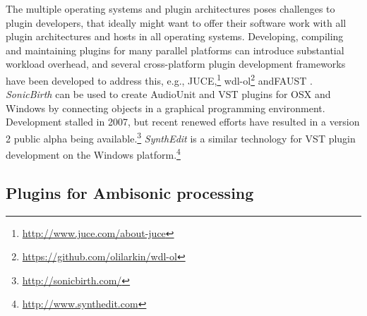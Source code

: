 \documentclass{article}
\begin{document}
The multiple operating systems and plugin architectures poses challenges to plugin developers, that ideally might want to offer their software work with all plugin architectures and hosts in all operating systems.
Developing, compiling and maintaining plugins for many parallel platforms can introduce substantial workload overhead, and several cross-platform plugin development frameworks have been developed to address this, e.g., JUCE,\footnote{\href{http://www.juce.com/about-juce}{http://www.juce.com/about-juce}} wdl-ol\footnote{\href{https://github.com/olilarkin/wdl-ol}{https://github.com/olilarkin/wdl-ol}} and\linebreak FAUST \cite{smithFaust:2012}. 
\emph{SonicBirth} can be used to create AudioUnit and VST plugins for OSX and Windows by connecting objects in a graphical programming environment. Development stalled in 2007, but recent renewed efforts have resulted in a version 2 public alpha being available.\footnote{\href{http://sonicbirth.com/}{http://sonicbirth.com/}}
\emph{SynthEdit} is a similar technology for VST plugin development on the Windows platform.\footnote{\href{http://www.synthedit.com}{http://www.synthedit.com}}


\subsection{Plugins for Ambisonic processing}\label{sec:ambi-plugins}
\end{document}
